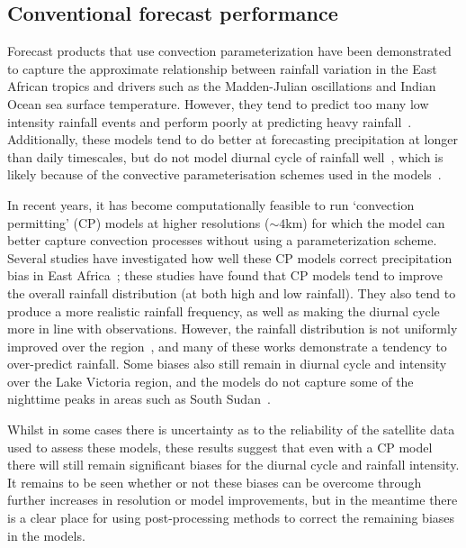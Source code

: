 \documentclass{article}
\begin{document}
\subsection{Conventional forecast performance}


Forecast products that use convection parameterization have been demonstrated to capture the approximate relationship between rainfall variation in the East African tropics and drivers such as the Madden-Julian oscillations and Indian Ocean sea surface temperature. However, they tend to predict too many low intensity rainfall events and perform poorly at predicting heavy rainfall~\citep{woodhams_what_2018, chamberlain_forecasting_2014, vogel_skill_2018, walker_skill_2019, bechtold_representing_2014, haiden_intercomparison_2012}. Additionally, these models tend to do better at forecasting precipitation at longer than daily timescales, but do not model diurnal cycle of rainfall well~\citep{kim_tropical_2013, macleod_drivers_2021, bechtold_simulation_2004}, which is likely because of the convective parameterisation schemes used in the models~\citep{vogel_skill_2018, marsham_role_2013, bechtold_representing_2014}. 

In recent years, it has become computationally feasible to run `convection permitting' (CP) models at higher resolutions ($\sim4\text{km}$) for which the model can better capture convection processes without using a parameterization scheme. Several studies have investigated how well these CP models correct precipitation bias in East Africa~\citep{finney_implications_2019, cafaro_convection-permitting_2021, woodhams_what_2018, chamberlain_forecasting_2014, kendon_enhanced_2019, senior_convection-permitting_2021}; these studies have found that CP models tend to improve the overall rainfall distribution (at both high and low rainfall). They also tend to produce a more realistic rainfall frequency, as well as making the diurnal cycle more in line with observations. However, the rainfall distribution is not uniformly improved over the region~\citep{senior_convection-permitting_2021}, and many of these works demonstrate a tendency to over-predict rainfall. Some biases also still remain in diurnal cycle and intensity over the Lake Victoria region, and the models do not capture some of the nighttime peaks in areas such as South Sudan~\citep{finney_implications_2019, chamberlain_forecasting_2014}. 

Whilst in some cases there is uncertainty as to the reliability of the satellite data used to assess these models, these results suggest that even with a CP model there will still remain significant biases for the diurnal cycle and rainfall intensity. It remains to be seen whether or not these biases can be overcome through further increases in resolution or model improvements, but in the meantime there is a clear place for using post-processing methods to correct the remaining biases in the models.
\end{document}
